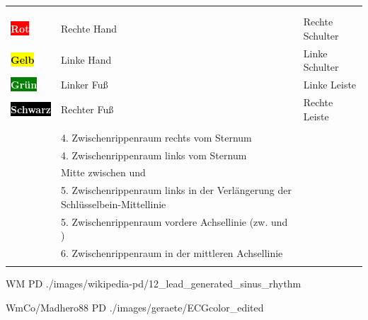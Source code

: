 {}%
{\label{tab:ekg-elektroden-position}}%
{}%
{}%
{%
\begin{tabulary}{\linewidth}{lLL}
\addlinespace\toprule\addlinespace
\noindent{} 
& 
\noindent{} 
&
\noindent{}
\\\addlinespace\midrule\addlinespace
{}
\\\addlinespace\midrule\addlinespace
\colorbox{red}{\sffamily\bfseries\textcolor{white}{Rot}} & Rechte Hand & Rechte
Schulter
\\
\colorbox{yellow}{\sffamily\bfseries Gelb} & Linke Hand & Linke
Schulter
\\
\colorbox{green}{\sffamily\bfseries\textcolor{white}{Grün}} & Linker Fuß  &
Linke Leiste
\\
\colorbox{black}{\sffamily\bfseries\textcolor{white}{Schwarz}} & Rechter Fuß &
Rechte Leiste 
\\\addlinespace\midrule\addlinespace
{}
\\\addlinespace\midrule\addlinespace
\textbf{} & 4. Zwischenrippenraum rechts vom Sternum
\\\addlinespace
\textbf{} & 4. Zwischenrippenraum links vom Sternum
\\\addlinespace
\textbf{} & Mitte zwischen  und 
\\\addlinespace
\textbf{} & 5. Zwischenrippenraum links in der Verlängerung
der Schlüsselbein-Mittellinie
\\\addlinespace
\textbf{} & 5. Zwischenrippenraum vordere Achsellinie (zw.  und ) 
\\\addlinespace
\textbf{} & 6. Zwischenrippenraum in der mittleren
Achsellinie 
\\\addlinespace\bottomrule
\end{tabulary}
}%



{}%
{}%
{WM}%
{PD}%
{./images/wikipedia-pd/12_lead_generated_sinus_rhythm}%
{}%


{}%
{}%
{WmCo/Madhero88}%
{PD}%
{./images/geraete/ECGcolor_edited}%
{}%








